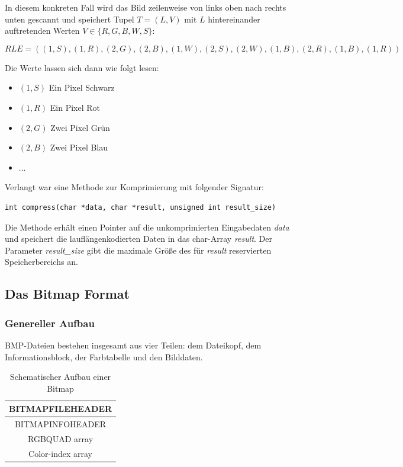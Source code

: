 \documentclass[11pt]{scrartcl}
\begin{document}
In diesem konkreten Fall wird das Bild zeilenweise von links oben nach rechts unten gescannt und speichert Tupel $T = (L,V)$ mit $L$ hintereinander auftretenden Werten $V \in \{ R,G,B,W,S\}$:

$$RLE = ((1,S),(1,R),(2,G),(2,B),(1,W),(2,S),(2,W),(1,B),(2,R),(1,B),(1,R))$$

Die Werte lassen sich dann wie folgt lesen:
\begin{itemize}
\item $(1,S)$ Ein Pixel Schwarz
\item $(1,R)$ Ein Pixel Rot
\item $(2,G)$ Zwei Pixel Grün
\item $(2,B)$ Zwei Pixel Blau
\item ...\\
\end{itemize}



Verlangt war eine Methode zur Komprimierung mit folgender Signatur:\\
\lstset{language=C, basicstyle=\small,  numbers=left, numberstyle=\tiny}
\begin{lstlisting}[caption={Signatur der compress-Methode},frame=single, captionpos=b, label=code-comm-task, xleftmargin=.03\textwidth]
int compress(char *data, char *result, unsigned int result_size)
\end{lstlisting}
Die Methode erhält einen Pointer auf die unkomprimierten Eingabedaten \textit{data} und speichert die lauflängenkodierten Daten in das char-Array \textit{result}. Der Parameter \textit{result\_size} gibt die maximale Größe des für \textit{result} reservierten Speicherbereichs an.




\subsection{Das Bitmap Format}

\subsubsection*{Genereller Aufbau}

BMP-Dateien bestehen insgesamt aus vier Teilen: dem Dateikopf, dem Informationsblock, der Farbtabelle und den Bilddaten. 

\begin{table}[h!]
\begin{center}
\caption{Schematischer Aufbau einer Bitmap}
\begin{tabular}{|c|}
\hline
BITMAPFILEHEADER\\
\hline
BITMAPINFOHEADER\\
\hline
RGBQUAD array\\
\hline
Color-index array\\
\hline
\end{tabular}
\end{center}
\end{table}
\end{document}
